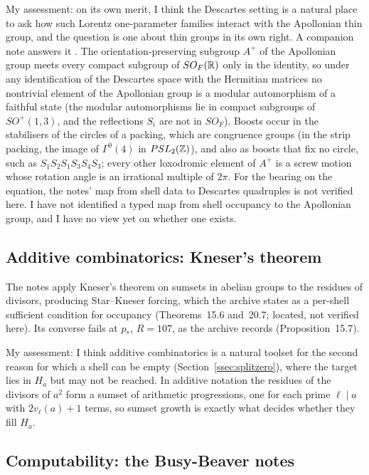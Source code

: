My assessment: on its own merit, I think the Descartes setting is a natural place to ask how such Lorentz one-parameter families interact with the Apollonian thin group, and the question is one about thin groups in its own right. A companion note answers it \cite{ApollonianNote}. The orientation-preserving subgroup $A^+$ of the Apollonian group meets every compact subgroup of $SO_F(\mathbb{R})$ only in the identity, so under any identification of the Descartes space with the Hermitian matrices no nontrivial element of the Apollonian group is a modular automorphism of a faithful state (the modular automorphisms lie in compact subgroups of $SO^+(1,3)$, and the reflections $S_i$ are not in $SO_F$). Boosts occur in the stabilisers of the circles of a packing, which are congruence groups (in the strip packing, the image of $\Gamma^0(4)$ in $PSL_2(\mathbb{Z})$), and also as boosts that fix no circle, such as $S_1S_2S_1S_3S_4S_3$; every other loxodromic element of $A^+$ is a screw motion whose rotation angle is an irrational multiple of $2\pi$. For the bearing on the equation, the notes' map from shell data to Descartes quadruples is not verified here. I have not identified a typed map from shell occupancy to the Apollonian group, and I have no view yet on whether one exists.

\subsection{Additive combinatorics: Kneser's theorem}

The notes apply Kneser's theorem on sumsets in abelian groups \cite{Kneser} to the residues of divisors, producing Star--Kneser forcing, which the archive states as a per-shell sufficient condition for occupancy (Theorems~15.6 and~20.7; located, not verified here). Its converse fails at $p_*$, $R=107$, as the archive records (Proposition~15.7).

My assessment: I think additive combinatorics is a natural toolset for the second reason for which a shell can be empty (Section~\ref{ssec:splitzero}), where the target lies in $H_a$ but may not be reached. In additive notation the residues of the divisors of $a^2$ form a sumset of arithmetic progressions, one for each prime $\ell\mid a$ with $2v_\ell(a)+1$ terms, so sumset growth is exactly what decides whether they fill $H_a$.

\subsection{Computability: the Busy-Beaver notes}

